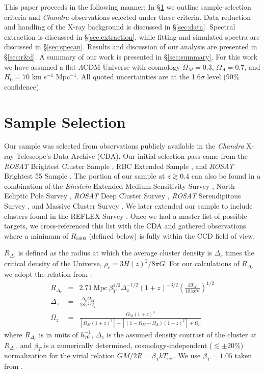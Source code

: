 \documentclass[12pt,preprint]{aastex}
\begin{document}
This paper proceeds in the following manner:
In \S\ref{sec:selection} we outline sample-selection criteria and {\it
Chandra} observations selected under these criteria. Data reduction
and handling of the X-ray background is discussed in
\S\ref{sec:data}. Spectral extraction is discussed in
\S\ref{sec:extraction}, while fitting and simulated spectra are
discussed in \S\ref{sec:specan}. Results and discussion of our
analysis are presented in \S\ref{sec:r&d}. A summary of our work is
presented in \S\ref{sec:summary}. For this work we have assumed a flat
$\Lambda$CDM Universe with cosmology $\Omega_{M} = 0.3$,
$\Omega_{\Lambda} = 0.7$, and $H_{0} = 70$ km s$^{-1}$ Mpc$^{-1}$. All
quoted uncertainties are at the 1.6$\sigma$ level (90\% confidence).

\section{Sample Selection} \label{sec:selection}

Our sample was selected from observations publicly available in the
{\it Chandra} X-ray Telescope's Data Archive (CDA). Our initial
selection pass came from the {\it{ROSAT}} Brightest Cluster Sample
\citep{1998MNRAS.301..881E}, RBC Extended Sample
\citep{2000MNRAS.318..333E}, and {\it{ROSAT}} Brightest 55 Sample
\citep{1990MNRAS.245..559E, 1998MNRAS.298..416P}. The portion of our
sample at $z \gtrsim 0.4$ can also be found in a combination of the
{\it{Einstein}} Extended Medium Sensitivity Survey
\citep{1990ApJS...72..567G}, North Ecliptic Pole Survey
\citep{2006ApJS..162..304H}, {\it{ROSAT}} Deep Cluster Survey
\citep{1995ApJ...445L..11R}, {\it{ROSAT}} Serendipitous Survey
\citep{1998ApJ...502..558V}, and Massive Cluster Survey
\citep{2001ApJ...553..668E}. We later extended our sample to include
clusters found in the REFLEX Survey \citep{2004A&A...425..367B}. Once
we had a master list of possible targets, we cross-referenced this
list with the CDA and gathered observations where a minimum of
$R_{5000}$ (defined below) is fully within the CCD field of
view.

$R_{\Delta_c}$ is defined as the radius at which the average cluster
density is $\Delta_c$ times the critical density of the Universe,
$\rho_c=3H(z)^2/8\pi G$. For our calculations of $R_{\Delta_c}$ we
adopt the relation from \cite{2002A&A...389....1A}:
\begin{eqnarray}
R_{\Delta_c} &=& 2.71 \mathrm{~Mpc~}
\beta_T^{1/2}
\Delta_{\mathrm{z}}^{-1/2}
(1+z)^{-3/2}
\left(\frac{kT_X}{10 \mathrm{~keV}}\right)^{1/2}\\
\Delta_z &=& \frac{\Delta_c \Omega_M}{18\pi^2\Omega_z} \nonumber \\
\Omega_z &=& \frac{\Omega_M (1+z)^3}{[\Omega_M
(1+z)^3]+[(1-\Omega_M-\Omega_{\Lambda})(1+z)^2]+\Omega_{\Lambda}} \nonumber
\end{eqnarray}
where $R_{\Delta_c}$ is in units of $h_{70}^{-1}$, $\Delta_c$ is
the assumed density contrast of the cluster at $R_{\Delta_c}$, and
$\beta_T$ is a numerically determined, cosmology-independent
($\lesssim \pm 20\%$) normalization for the virial relation $GM/2R =
\beta_TkT_{vir}$. We use $\beta_T = 1.05$ taken from
\cite{1996ApJ...469..494E}.
\end{document}
